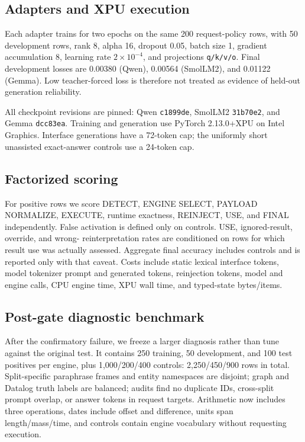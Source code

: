 \documentclass[10pt]{article}
\begin{document}
\subsection{Adapters and XPU execution}

Each adapter trains for two epochs on the same 200 request-policy rows, with 50
development rows, rank 8, alpha 16, dropout 0.05, batch size 1, gradient
accumulation 8, learning rate $2\times10^{-4}$, and projections
\texttt{q/k/v/o}.  Final development losses are 0.00380 (Qwen), 0.00564
(SmolLM2), and 0.01122 (Gemma).  Low teacher-forced loss is therefore not treated
as evidence of held-out generation reliability.

All checkpoint revisions are pinned: Qwen \texttt{c1899de}, SmolLM2
\texttt{31b70e2}, and Gemma \texttt{dcc83ea}.  Training and generation use
PyTorch 2.13.0+XPU on Intel Graphics.  Interface generations have a 72-token cap;
the uniformly short unassisted exact-answer controls use a 24-token cap.

\subsection{Factorized scoring}

For positive rows we score DETECT, ENGINE SELECT, PAYLOAD NORMALIZE, EXECUTE,
runtime exactness, REINJECT, USE, and FINAL independently.  False activation is
defined only on controls.  USE, ignored-result, override, and wrong-
reinterpretation rates are conditioned on rows for which result use was actually
assessed.  Aggregate final accuracy includes controls and is reported only with
that caveat.  Costs include static lexical interface tokens, model tokenizer
prompt and generated tokens, reinjection tokens, model and engine calls, CPU
engine time, XPU wall time, and typed-state bytes/items.

\subsection{Post-gate diagnostic benchmark}

After the confirmatory failure, we freeze a larger diagnosis rather than tune
against the original test.  It contains 250 training, 50 development, and 100
test positives per engine, plus 1,000/200/400 controls: 2,250/450/900 rows in
total.  Split-specific paraphrase frames and entity namespaces are disjoint;
graph and Datalog truth labels are balanced; audits find no duplicate IDs,
cross-split prompt overlap, or answer tokens in request targets.  Arithmetic now
includes three operations, dates include offset and difference, units span
length/mass/time, and controls contain engine vocabulary without requesting
execution.
\end{document}
